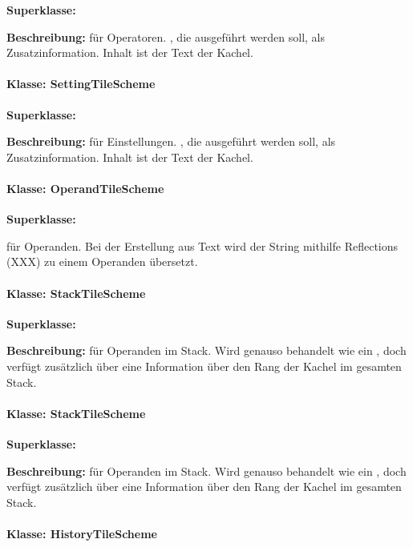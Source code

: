 \textbf{Superklasse:} 

\textbf{Beschreibung:} für Operatoren. , die ausgeführt werden soll, als Zusatzinformation. Inhalt ist der Text der Kachel.

\paragraph{Klasse: SettingTileScheme}

\textbf{Superklasse:} 

\textbf{Beschreibung:}  für Einstellungen. , die ausgeführt werden soll, als Zusatzinformation. Inhalt ist der Text der Kachel. 

\paragraph{Klasse: OperandTileScheme}

\textbf{Superklasse:} 

  für Operanden. Bei der Erstellung aus Text wird der String mithilfe Reflections (XXX) zu einem Operanden übersetzt.

\paragraph{Klasse: StackTileScheme}

\textbf{Superklasse:}

\textbf{Beschreibung:} für Operanden im Stack. Wird genauso behandelt wie ein , doch verfügt zusätzlich über eine Information über den Rang der Kachel im gesamten Stack.

\paragraph{Klasse: StackTileScheme}

\textbf{Superklasse:} 

\textbf{Beschreibung:}  für Operanden im Stack. Wird genauso behandelt wie ein , doch verfügt zusätzlich über eine Information über den Rang der Kachel im gesamten Stack.

\paragraph{Klasse: HistoryTileScheme}

